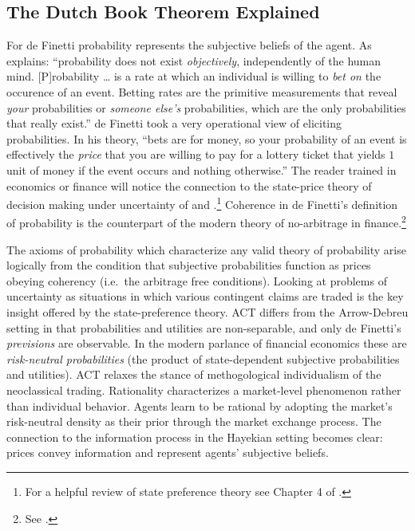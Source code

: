 \documentclass[11pt,]{article}
\begin{document}
\subsection{The Dutch Book Theorem
Explained}\label{the-dutch-book-theorem-explained}

For de Finetti probability represents the subjective beliefs of the
agent. As \citet{Nau2001} explains: ``probability does not exist
\emph{objectively}, independently of the human mind. {[}P{]}robability
\ldots{} is a rate at which an individual is willing to \emph{bet on}
the occurence of an event. Betting rates are the primitive measurements
that reveal \emph{your} probabilities or \emph{someone else's}
probabilities, which are the only probabilities that really exist.'' de
Finetti took a very operational view of eliciting probabilities. In his
theory, ``bets are for money, so your probability of an event is
effectively the \emph{price} that you are willing to pay for a lottery
ticket that yields \(1\) unit of money if the event occurs and nothing
otherwise.'' The reader trained in economics or finance will notice the
connection to the state-price theory of decision making under
uncertainty of \citet{Arrow1964} and \citet{Debreu1959}.\footnote{For a
  helpful review of state preference theory see Chapter 4 of
  \citet{CopelandWestonShastri}.} Coherence in de Finetti's definition
of probability is the counterpart of the modern theory of no-arbitrage
in finance.\footnote{See \citet{PressaccoZiani2010}.}

The axioms of probability which characterize any valid theory of
probability arise logically from the condition that subjective
probabilities function as prices obeying coherency (i.e.~the arbitrage
free conditions). Looking at problems of uncertainty as situations in
which various contingent claims are traded is the key insight offered by
the state-preference theory. ACT differs from the Arrow-Debreu setting
in that probabilities and utilities are non-separable, and only de
Finetti's \emph{previsions} are observable. In the modern parlance of
financial economics these are \emph{risk-neutral probabilities} (the
product of state-dependent subjective probabilities and utilities). ACT
relaxes the stance of methogological individualism of the neoclassical
trading. Rationality characterizes a market-level phenomenon rather than
individual behavior. Agents learn to be rational by adopting the
market's risk-neutral density as their prior through the market exchange
process. The connection to the information process in the Hayekian
setting becomes clear: prices convey information and represent agents'
subjective beliefs.
\end{document}
